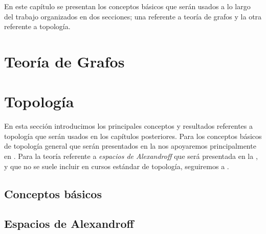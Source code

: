En este capítulo se presentan los conceptos básicos que serán usados a lo largo del trabajo organizados en dos secciones; una referente a teoría de grafos y la otra referente a topología.
\section{Teoría de Grafos}
%
%
%
\section{Topología}
En esta sección introducimos los principales conceptos y resultados referentes a topología que serán usados en los capítulos posteriores. Para los conceptos básicos de topología general que serán presentados en la  nos apoyaremos principalmente en \cite{munkres2000}. Para la teoría referente a \textit{espacios de Alexandroff} que será presentada en la , y que no se suele incluir en cursos estándar de topología, seguiremos a \cite{mesa2019}.
\subsection{Conceptos básicos}\label{subsec:topologia_general}

\subsection{Espacios de Alexandroff}\label{subsec:Alexandroff}

